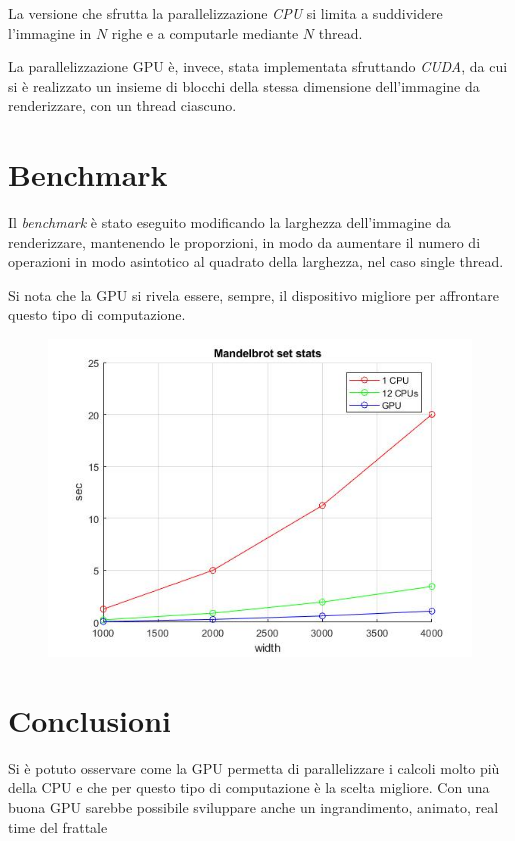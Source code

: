 \documentclass[12pt]{article}
\begin{document}
La versione che sfrutta la parallelizzazione \emph{CPU} si limita a suddividere l'immagine in $N$ righe e a computarle mediante $N$ thread.

La parallelizzazione GPU è, invece, stata implementata sfruttando \emph{CUDA}, da cui si è realizzato un insieme di blocchi della stessa dimensione dell'immagine da renderizzare, con un thread ciascuno.

\section{Benchmark}

Il \emph{benchmark} è stato eseguito modificando la larghezza dell'immagine da renderizzare, mantenendo le proporzioni, in modo da aumentare il numero di operazioni in modo asintotico al quadrato della larghezza, nel caso single thread.

Si nota che la GPU si rivela essere, sempre, il dispositivo migliore per affrontare questo tipo di computazione.

\begin{figure}[h]
\includegraphics[width=\textwidth]{MandelbrotStats.jpg}
\centering
\end{figure}

\section{Conclusioni}
Si è potuto osservare come la GPU permetta di parallelizzare i calcoli molto più della CPU e che per questo tipo di computazione è la scelta migliore. Con una buona GPU sarebbe possibile sviluppare anche un ingrandimento, animato, real time del frattale
\end{document}
